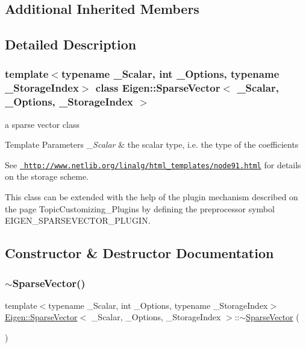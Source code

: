 \subsection*{Additional Inherited Members}


\subsection{Detailed Description}
\subsubsection*{template$<$typename \+\_\+\+Scalar, int \+\_\+\+Options, typename \+\_\+\+Storage\+Index$>$\newline
class Eigen\+::\+Sparse\+Vector$<$ \+\_\+\+Scalar, \+\_\+\+Options, \+\_\+\+Storage\+Index $>$}

a sparse vector class 


\begin{DoxyTemplParams}{Template Parameters}
{\em \+\_\+\+Scalar} & the scalar type, i.\+e. the type of the coefficients\\
\hline
\end{DoxyTemplParams}
See \href{http://www.netlib.org/linalg/html_templates/node91.html}{\texttt{ http\+://www.\+netlib.\+org/linalg/html\+\_\+templates/node91.\+html}} for details on the storage scheme.

This class can be extended with the help of the plugin mechanism described on the page Topic\+Customizing\+\_\+\+Plugins by defining the preprocessor symbol {\ttfamily E\+I\+G\+E\+N\+\_\+\+S\+P\+A\+R\+S\+E\+V\+E\+C\+T\+O\+R\+\_\+\+P\+L\+U\+G\+IN}. 

\subsection{Constructor \& Destructor Documentation}
\mbox{\label{class_eigen_1_1_sparse_vector_ad519592c203aedf33c524feb1bdaad1b}} 
\subsubsection{\texorpdfstring{$\sim$SparseVector()}{~SparseVector()}}
{\footnotesize\ttfamily template$<$typename \+\_\+\+Scalar, int \+\_\+\+Options, typename \+\_\+\+Storage\+Index$>$ \\
\mbox{\hyperlink{class_eigen_1_1_sparse_vector}{Eigen\+::\+Sparse\+Vector}}$<$ \+\_\+\+Scalar, \+\_\+\+Options, \+\_\+\+Storage\+Index $>$\+::$\sim$\mbox{\hyperlink{class_eigen_1_1_sparse_vector}{Sparse\+Vector}} (\begin{DoxyParamCaption}{ }\end{DoxyParamCaption})\hspace{0.3cm}{\ttfamily [inline]}}

